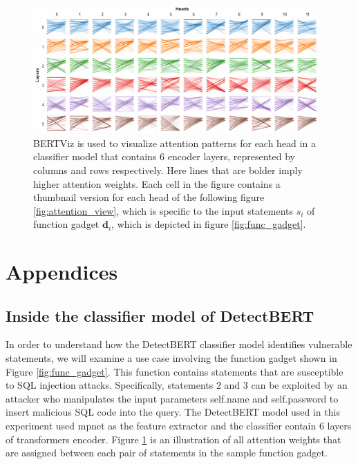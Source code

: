 \documentclass{ieeeaccess}
\begin{document}
\EOD
\begin{figure}[h]
    \centering
    \includegraphics[width=0.97\textwidth, align=center]{attention_heads.png}
    \caption{BERTViz \cite{bertviz} is used to visualize attention patterns for each head in a classifier model that contains 6 encoder layers, represented by columns and rows respectively. Here lines that are bolder imply higher attention weights. Each cell in the figure contains a thumbnail version for each head of the following figure \ref{fig:attention_view}, which is specific to the input statements $s_{i}$ of function gadget $\mathbf{d}_i$, which is depicted in figure \ref{fig:func_gadget}.}
    \label{fig:model_view}
\end{figure}
\section{Appendices}
\subsection{Inside the classifier model of DetectBERT} \label{sec:behind_the_scene}
\par In order to understand how the DetectBERT classifier model identifies vulnerable statements, we will examine a use case involving the function gadget shown in Figure \ref{fig:func_gadget}. This function contains statements that are susceptible to SQL injection attacks. Specifically, statements 2 and 3 can be exploited by an attacker who manipulates the input parameters self.name and self.password to insert malicious SQL code into the query. The DetectBERT model used in this experiment used mpnet as the feature extractor and the classifier contain  6 layers of transformers encoder. Figure \ref{fig:model_view} is an illustration of all attention weights that are assigned between each pair of statements in the sample function gadget.
\end{document}
